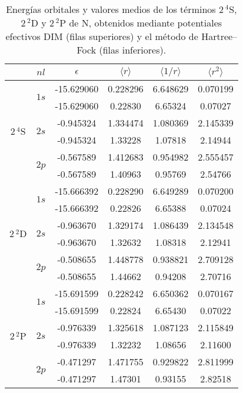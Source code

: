 \begin{table}
\centering
\begin{tabular}{|c|c|c|c|c|c|}
\hline
   & $nl$ &  $\epsilon$  
   & $\langle r \rangle$
   & $\langle 1/r \rangle$ 
   & $\langle r^2 \rangle$ \\ 
\hline
\hline
\multirow{6}{*}{$2\,^4$S}
   & \multirow{2}{*}{$1s$} 
          & -15.629060 & 0.228296 & 6.648629 & 0.070199 \\
   &      & -15.629060 & 0.22830  & 6.65324  & 0.07027  \\
\cline{2-6}
   & \multirow{2}{*}{$2s$}
          & -0.945324  & 1.334474 & 1.080369 & 2.145339 \\
   &      & -0.945324  & 1.33228  & 1.07818  & 2.14944  \\
\cline{2-6}
   & \multirow{2}{*}{$2p$}
          & -0.567589  & 1.412683 & 0.954982 & 2.555457 \\
   &      & -0.567589  & 1.40963  & 0.95769  & 2.54766  \\
\hline
\multirow{6}{*}{$2\,^2$D}
   & \multirow{2}{*}{$1s$}
          & -15.666392 & 0.228290 & 6.649289 & 0.070200 \\
   &      & -15.666392 & 0.22826  & 6.65388  & 0.07024  \\
\cline{2-6}
   & \multirow{2}{*}{$2s$}
          & -0.963670  & 1.329174 & 1.086439 & 2.134548 \\
   &      & -0.963670  & 1.32632  & 1.08318  & 2.12941  \\
\cline{2-6}
   & \multirow{2}{*}{$2p$}
          & -0.508655  & 1.448778 & 0.938821 & 2.709128 \\
   &      & -0.508655  & 1.44662  & 0.94208  & 2.70716  \\
\hline
\multirow{6}{*}{$2\,^2$P}
   & \multirow{2}{*}{$1s$}
          & -15.691599 & 0.228242 & 6.650362 & 0.070167 \\
   &      & -15.691599 & 0.22824  & 6.65430  & 0.07022  \\
\cline{2-6}
   & \multirow{2}{*}{$2s$}
          & -0.976339  & 1.325618 & 1.087123 & 2.115849 \\
   &      & -0.976339  & 1.32232  & 1.08656  & 2.11600  \\
\cline{2-6}
   & \multirow{2}{*}{$2p$}
          & -0.471297  & 1.471755 & 0.929822 & 2.811999 \\
   &      & -0.471297  & 1.47301  & 0.93155  & 2.82518  \\
\hline
\end{tabular}
\caption[Energías y valores medios orbitales de nitrógeno.]
{Energías orbitales y valores medios de los términos 
$2\,^4$S, $2\,^2$D y $2\,^2$P de N, obtenidos mediante potentiales 
efectivos DIM (filas superiores) y el método de Hartree--Fock (filas 
inferiores).} 
\label{tab:resultsNitro}
\end{table}

